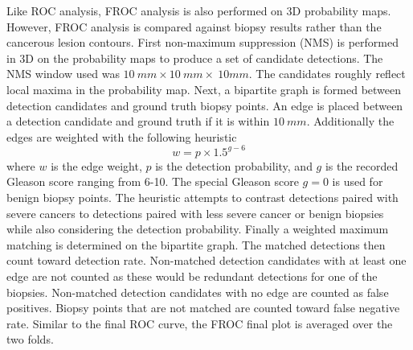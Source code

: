 Like ROC analysis, FROC analysis is also performed on 3D probability maps. However, FROC analysis is compared against biopsy results rather than the cancerous lesion contours. First non-maximum suppression (NMS) is performed in 3D on the probability maps to produce a set of candidate detections. The NMS window used was $10\ mm \times 10\ mm \times\ 10mm$. The candidates roughly reflect local maxima in the probability map. Next, a bipartite graph is formed between detection candidates and ground truth biopsy points. An edge is placed between a detection candidate and ground truth if it is within $10\ mm$. Additionally the edges are weighted with the following heuristic
\begin{equation}
w = p \times 1.5^{g - 6}
\end{equation}
where $w$ is the edge weight, $p$ is the detection probability, and $g$ is the recorded Gleason score ranging from 6-10. The special Gleason score $g = 0$ is used for benign biopsy points. The heuristic attempts to contrast detections paired with severe cancers to detections paired with less severe cancer or benign biopsies while also considering the detection probability. Finally a weighted maximum matching is determined on the bipartite graph. The matched detections then count toward detection rate. Non-matched detection candidates with at least one edge are not counted as these would be redundant detections for one of the biopsies. Non-matched detection candidates with no edge are counted as false positives. Biopsy points that are not matched are counted toward false negative rate. Similar to the final ROC curve, the FROC final plot is averaged over the two folds. 


